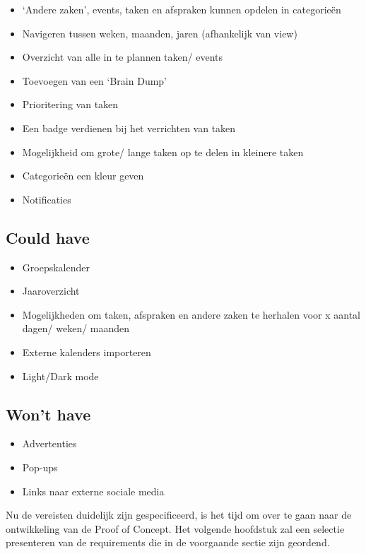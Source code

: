     \begin{itemize}
        \item	‘Andere zaken’, events, taken en afspraken kunnen opdelen in categorieën
        \item	Navigeren tussen weken, maanden, jaren (afhankelijk van view)
        \item	Overzicht van alle in te plannen taken/ events
        \item	Toevoegen van een ‘Brain Dump’ 
        \item	Prioritering van taken
        \item	Een badge verdienen bij het verrichten van taken
        \item	Mogelijkheid om grote/ lange taken op te delen in kleinere taken
        \item	Categorieën een kleur geven
        \item	Notificaties 
    \end{itemize}
    

\subsection{Could have}

    \begin{itemize}
        \item 	Groepskalender
        \item 	Jaaroverzicht
        \item 	Mogelijkheden om taken, afspraken en andere zaken te herhalen voor x aantal dagen/ weken/ maanden
        \item 	Externe kalenders importeren
        \item 	Light/Dark mode 
    \end{itemize}
    
    
\subsection{Won't have}

    \begin{itemize}
        \item	Advertenties
        \item	Pop-ups
        \item	Links naar externe sociale media
         
    \end{itemize}


Nu de vereisten duidelijk zijn gespecificeerd, is het tijd om over te gaan naar de ontwikkeling van de Proof of Concept. Het volgende hoofdstuk zal een selectie presenteren van de requirements die in de voorgaande sectie zijn geordend. \newline


